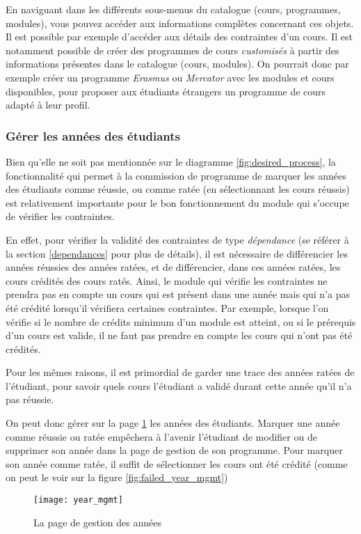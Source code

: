 En naviguant dans les différents sous-menus du catalogue (cours, programmes, modules), vous pouvez accéder aux informations complètes concernant ces objets. Il est possible par exemple d'accéder aux détails des contraintes d'un cours. Il est notamment possible de créer des programmes de cours \textit{customisés} à partir des informations présentes dans le catalogue (cours, modules). On pourrait donc par exemple créer un programme \textit{Erasmus} ou \textit{Mercator} avec les modules et cours disponibles, pour proposer aux étudiants étrangers un programme de cours adapté à leur profil.

\subsubsection{Gérer les années des étudiants}
\label{year_mgmt}
Bien qu'elle ne soit pas mentionnée sur le diagramme \ref{fig:desired_process}, la fonctionnalité qui permet à la commission de programme de marquer les années des étudiants comme réussie, ou comme ratée (en sélectionnant les cours réussis) est relativement importante pour le bon fonctionnement du module qui s'occupe de vérifier les contraintes. 


En effet, pour vérifier la validité des contraintes de type \textit{dépendance} (se référer à  la section \ref{dependances} pour plus de détails), il est nécessaire de différencier les années réussies des années ratées, et de différencier, dans ces années ratées, les cours crédités des cours ratés. Ainsi, le module qui vérifie les contraintes ne prendra pas en compte un cours qui est présent dans une année mais qui n'a pas été crédité lorsqu'il vérifiera certaines contraintes. Par exemple, lorsque l'on vérifie si le nombre de crédits minimum d'un module est atteint, ou si le prérequis d'un cours est valide, il ne faut pas prendre en compte les cours qui n'ont pas été crédités. 

Pour les mêmes raisons, il est primordial de garder une trace des années ratées de l'étudiant, pour savoir quels cours l'étudiant a validé durant cette année qu'il n'a pas réussie.

On peut donc gérer sur la page \ref{fig:year_mgmt} les années des étudiants. Marquer une année comme réussie ou ratée empêchera à l'avenir l'étudiant de modifier ou de supprimer son année dans la page de gestion de son programme. Pour marquer son année comme ratée, il suffit de sélectionner les cours ont été crédité (comme on peut le voir sur la figure \ref{fig:failed_year_mgmt})
\begin{figure}[!htb]
\centering
\caption{La page de gestion des années}
\label{fig:year_mgmt}
\texttt{[image: year\_mgmt]}
\end{figure}

